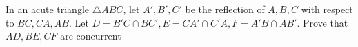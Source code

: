 In an acute triangle $\triangle ABC$, let $A',B',C'$ be the reflection of $A,B,C$ with respect to $BC,CA,AB$. Let $D = B'C \cap BC',E = CA' \cap C'A,F = A'B \cap AB'$. Prove that $AD,BE,CF$ are concurrent